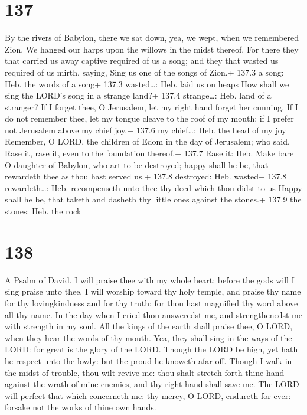 \hypertarget{section-137}{%
\section{137}\label{section-137}}

 By the rivers of Babylon, there we sat down, yea, we wept,
when we remembered Zion.  We hanged our harps upon the
willows in the midst thereof.  For there they that carried
us away captive required of us a song; and they that wasted us required
of us mirth, saying, Sing us one of the songs of Zion.+ 137.3 a song:
Heb. the words of a song+ 137.3 wasted\ldots: Heb. laid us on heaps
 How shall we sing the LORD's song in a strange land?+ 137.4
strange\ldots: Heb. land of a stranger?  If I forget thee, O
Jerusalem, let my right hand forget her cunning.  If I do
not remember thee, let my tongue cleave to the roof of my mouth; if I
prefer not Jerusalem above my chief joy.+ 137.6 my chief\ldots: Heb. the
head of my joy  Remember, O LORD, the children of Edom in
the day of Jerusalem; who said, Rase it, rase it, even to the foundation
thereof.+ 137.7 Rase it: Heb. Make bare  O daughter of
Babylon, who art to be destroyed; happy shall he be, that rewardeth thee
as thou hast served us.+ 137.8 destroyed: Heb. wasted+ 137.8
rewardeth\ldots: Heb. recompenseth unto thee thy deed which thou didst
to us  Happy shall he be, that taketh and dasheth thy little
ones against the stones.+ 137.9 the stones: Heb. the rock

\hypertarget{section-138}{%
\section{138}\label{section-138}}

A Psalm of David.  I will praise thee with my whole heart:
before the gods will I sing praise unto thee.  I will
worship toward thy holy temple, and praise thy name for thy
lovingkindness and for thy truth: for thou hast magnified thy word above
all thy name.  In the day when I cried thou answeredst me,
and strengthenedst me with strength in my soul.  All the
kings of the earth shall praise thee, O LORD, when they hear the words
of thy mouth.  Yea, they shall sing in the ways of the LORD:
for great is the glory of the LORD.  Though the LORD be
high, yet hath he respect unto the lowly: but the proud he knoweth afar
off.  Though I walk in the midst of trouble, thou wilt
revive me: thou shalt stretch forth thine hand against the wrath of mine
enemies, and thy right hand shall save me.  The LORD will
perfect that which concerneth me: thy mercy, O LORD, endureth for ever:
forsake not the works of thine own hands.

